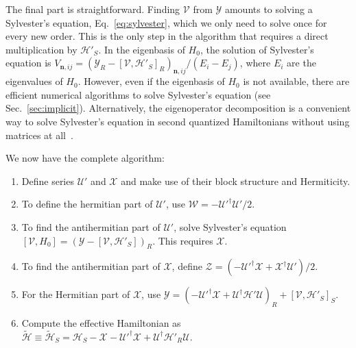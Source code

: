The final part is straightforward.
Finding $\mathcal{V}$ from $\mathcal{Y}$ amounts to solving a Sylvester's equation, Eq.~\ref{eq:sylvester}, which we only need to solve once for every new order.
This is the only step in the algorithm that requires a direct multiplication by $\mathcal{H}'_{S}$.
In the eigenbasis of $H_0$, the solution of Sylvester's equation is $V_{\mathbf{n}, ij} = (\mathcal{Y}_{R} - [\mathcal{V},
\mathcal{H}'_{S}]_{R})_{\mathbf{n}, ij}/(E_i - E_j)$, where $E_i$ are the eigenvalues of $H_0$.
However, even if the eigenbasis of $H_0$ is not available, there are efficient numerical algorithms to solve Sylvester's equation (see Sec.~\ref{sec:implicit}).
Alternatively, the eigenoperator decomposition is a convenient way to solve Sylvester's equation in second quantized Hamiltonians without using matrices at all~\cite{Landi_2024,Reascos_2024}.

We now have the complete algorithm:
%
\begin{enumerate}
    \item Define series $\mathcal{U}'$ and $\mathcal{X}$ and make use of their block structure and Hermiticity.
    \item To define the hermitian part of $\mathcal{U}'$, use $\mathcal{W} = -\mathcal{U}'^\dagger\mathcal{U}'/2$.
    \item To find the antihermitian part of $\mathcal{U}'$, solve Sylvester's equation \\ $[\mathcal{V}, H_0] = (\mathcal{Y} - [\mathcal{V}, \mathcal{H}'_{S}])_{R}$.
      This requires $\mathcal{X}$.
    \item To find the antihermitian part of $\mathcal{X}$, define $\mathcal{Z} = (-\mathcal{U}'^\dagger\mathcal{X} + \mathcal{X}^\dagger\mathcal{U}')/2$.
    \item For the Hermitian part of $\mathcal{X}$, use $\mathcal{Y} = (-\mathcal{U}'^\dagger\mathcal{X} + \mathcal{U}^\dagger\mathcal{H}'\mathcal{U})_{R} + [\mathcal{V}, \mathcal{H}'_{S}]_{S}$.
    \item  Compute the effective Hamiltonian as $\tilde{\mathcal{H}} \equiv \tilde{\mathcal{H}}_{S} = \mathcal{H}_{S} - \mathcal{X} - \mathcal{U}'^\dagger \mathcal{X} + \mathcal{U}^\dagger\mathcal{H}'_{R}\mathcal{U}$.
\end{enumerate}

